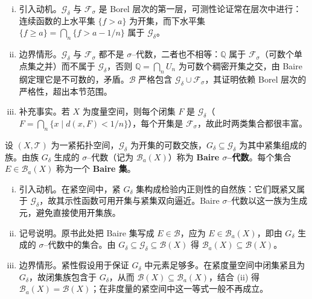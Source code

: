 \documentclass[../../main.tex]{subfiles}%
\begin{document}
\begin{remark}\label{remark:ch01-GdeltaFsigma}
\begin{enumerate}[(i)]
\item 引入动机。$\mathcal{G}_\delta$ 与 $\mathcal{F}_\sigma$ 是 Borel 层次的第一层，可测性论证常在层次中进行：连续函数的上水平集 $\{f>a\}$ 为开集，而下水平集 $\{f\geqslant a\}=\bigcap_n\{f>a-1/n\}$ 属于 $\mathcal{G}_\delta$。
\item 边界情形。$\mathcal{G}_\delta$ 与 $\mathcal{F}_\sigma$ 都不是 $\sigma$--代数，二者也不相等：$\mathbb{Q}$ 属于 $\mathcal{F}_\sigma$（可数个单点集之并）而不属于 $\mathcal{G}_\delta$，否则 $\mathbb{Q}=\bigcap_nU_n$ 为可数个稠密开集之交，由 Baire 纲定理它是不可数的，矛盾。$\mathcal{B}$ 严格包含 $\mathcal{G}_\delta\cup\mathcal{F}_\sigma$，其证明依赖 Borel 层次的严格性，超出本节范围。
\item 补充事实。若 $X$ 为度量空间，则每个闭集 $F$ 是 $\mathcal{G}_\delta$（$F=\bigcap_n\{x\mid d(x,F)<1/n\}$），每个开集是 $\mathcal{F}_\sigma$，故此时两类集合都很丰富。
\end{enumerate}
\end{remark}

\begin{definition}\label{definition:ch01-Baire代数}
设 $(X,\mathcal{T})$ 为一紧拓扑空间，$\mathcal{G}_\delta$ 为开集的可数交族，$G_\delta\subseteq\mathcal{G}_\delta$ 为其中紧集组成的族。由族 $G_\delta$ 生成的 $\sigma$--代数（记为 $\mathcal{B}_a(X)$）称为 \textbf{Baire $\sigma$--代数}。每个集合 $E\in\mathcal{B}_a(X)$ 称为一个 \textbf{Baire 集}。
\end{definition}

\begin{remark}\label{remark:ch01-Baire代数}
\begin{enumerate}[(i)]
\item 引入动机。在紧空间中，紧 $G_\delta$ 集构成检验内正则性的自然族：它们既紧又属于 $\mathcal{G}_\delta$，故其示性函数可用开集与紧集双向逼近。Baire $\sigma$--代数以这一族为生成元，避免直接使用开集族。
\item 记号说明。原书此处把 Baire 集写成 $E\in\mathcal{B}$，应为 $E\in\mathcal{B}_a(X)$，即由 $G_\delta$ 生成的 $\sigma$--代数中的集合。由 $G_\delta\subseteq\mathcal{G}_\delta\subseteq\mathcal{B}(X)$ 得 $\mathcal{B}_a(X)\subseteq\mathcal{B}(X)$。
\item 边界情形。紧性假设用于保证 $G_\delta$ 中元素足够多。在紧度量空间中闭集紧且为 $G_\delta$，故闭集族包含于 $G_\delta$，从而 $\mathcal{B}(X)\subseteq\mathcal{B}_a(X)$，结合 (ii) 得 $\mathcal{B}_a(X)=\mathcal{B}(X)$；在非度量的紧空间中这一等式一般不再成立。
\end{enumerate}
\end{remark}
\end{document}
